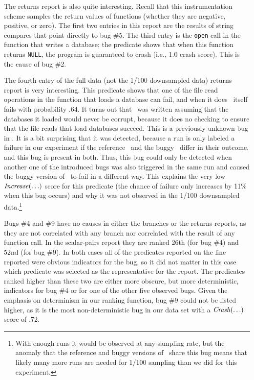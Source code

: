 The returns report is also quite interesting.  Recall that this
instrumentation scheme samples the return values of functions (whether
they are negative, positive, or zero).  The first two entries in this
report are the results of string compares that point directly to bug
\#5.  The third entry is the {\tt open} call in the function that writes
a database; the predicate shows that when this function returns {\tt NULL},
the program is guaranteed to crash (i.e., 1.0 crash score).  This is the
cause of bug \#2.

The fourth entry of the full data (not the 1/100 downsampled data)
returns report is very interesting.  This predicate shows that one of
the file read operations in the function that loads a database can
fail, and when it does \moss\ itself fails with probability .64.
It turns out that \moss\ was written assuming that the databases it
loaded would never be corrupt, because it does no checking to ensure
that the file reads that load databases succeed.  This is a previously
unknown bug in \moss.  It is a bit surprising that it was detected,
because a run is only labeled a failure in our experiment if the
reference \moss\ and the buggy \moss\ differ in their outcome, and
this bug is present in both.  Thus, this bug could only be detected
when another one of the introduced bugs was also triggered in the same
run and caused the buggy version of \moss\ to fail in a different way.
This explains the very low $\mbox{\textit{Increase}}(\ldots)$ score for this
predicate (the chance of failure only increases by 11\% when this bug
occurs) and why it was not observed in the 1/100 downsampled data.\footnote{With enough runs it would be observed at any sampling rate, but the anomaly that
the reference and buggy versions of \moss\ share this bug means that likely
many more runs are needed for 1/100 sampling than we did for this experiment.}

Bugs \#4 and \#9 have no causes in either the branches or the returns
reports, as they are not correlated with any branch nor correlated
with the result of any function call.  In the scalar-pairs report they
are ranked 26th (for bug \#4) and 52nd (for bug \#9).  In both cases
all of the predicates reported on the line reported were obvious
indicators for the bug, so it did not matter in this case which
predicate was selected as the representative for the report.  The
predicates ranked higher than these two are either more obscure,
but more deterministic, indicators for bug \#4 or for one of the other five observed bugs.
Given the emphasis on determinism in our ranking function, bug \#9 could not be listed
higher, as it is the most non-deterministic bug in our data set with a
$\mbox{\textit{Crash}}(\ldots)$ score of .72.

